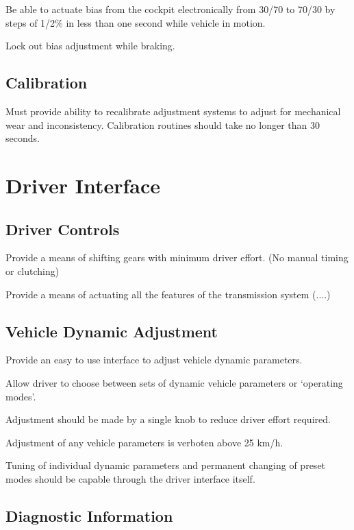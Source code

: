 Be able to actuate bias from the cockpit electronically from 30/70
to 70/30 by steps of 1/2\% in less than one second while vehicle in
motion.

Lock out bias adjustment while braking.


\subsection{Calibration}

Must provide ability to recalibrate adjustment systems to adjust for
mechanical wear and inconsistency. Calibration routines should take
no longer than 30 seconds. 





\section{Driver Interface}


\subsection{Driver Controls}

Provide a means of shifting gears with minimum driver effort. (No
manual timing or clutching)

Provide a means of actuating all the features of the transmission
system (....)


\subsection{Vehicle Dynamic Adjustment}

Provide an easy to use interface to adjust vehicle dynamic parameters.

Allow driver to choose between sets of dynamic vehicle parameters
or `operating modes'.

Adjustment should be made by a single knob to reduce driver effort
required.

Adjustment of any vehicle parameters is verboten above 25 km/h.

Tuning of individual dynamic parameters and permanent changing of
preset modes should be capable through the driver interface itself.


\subsection{Diagnostic Information}


